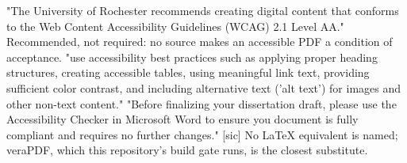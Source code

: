 %
%
%
	{"The University of Rochester recommends creating digital content that
	 conforms to the Web Content Accessibility Guidelines (WCAG) 2.1 Level AA."
	 Recommended, not required: no source makes an accessible PDF a condition of
	 acceptance.}
	{"use accessibility best practices such as applying proper heading
	 structures, creating accessible tables, using meaningful link text,
	 providing sufficient color contrast, and including alternative text ('alt
	 text') for images and other non-text content."}
	{"Before finalizing your dissertation draft, please use the Accessibility
	 Checker in Microsoft Word to ensure you document is fully compliant and
	 requires no further changes." [sic] No LaTeX equivalent is named; veraPDF,
	 which this repository's build gate runs, is the closest substitute.}

